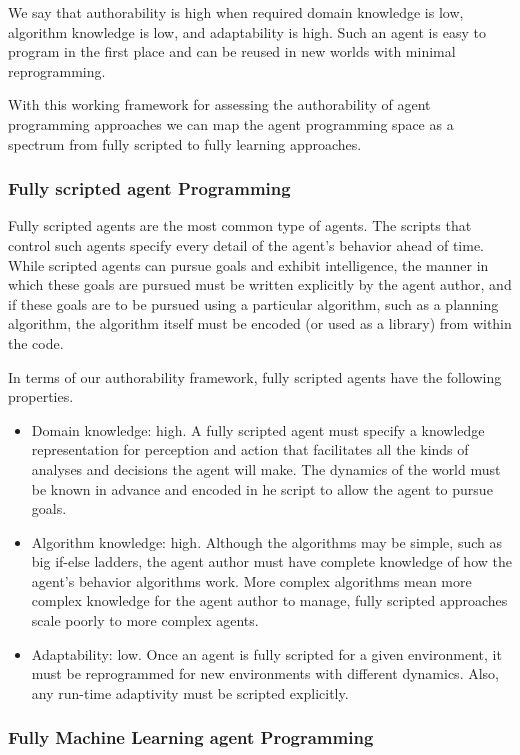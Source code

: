 We say that authorability is high when required domain knowledge is low, algorithm knowledge is low, and adaptability is high.  Such an agent is easy to program in the first place and can be reused in new worlds with minimal reprogramming.

With this working framework for assessing the authorability of agent programming approaches we can map the agent programming space as a spectrum from fully scripted to fully learning approaches.

\subsubsection{Fully scripted agent Programming}

Fully scripted agents are the most common type of agents.  The scripts that control such agents specify every detail of the agent's behavior ahead of time.  While scripted agents can pursue goals and exhibit intelligence, the manner in which these goals are pursued must be written explicitly by the agent author, and if these goals are to be pursued using a particular algorithm, such as a planning algorithm, the algorithm itself must be encoded (or used as a library) from within the code.

In terms of our authorability framework, fully scripted agents have the following properties.

\begin{itemize}
\item Domain knowledge: high. A fully scripted agent must specify a knowledge representation for perception and action that facilitates all the kinds of analyses and decisions the agent will make.  The dynamics of the world must be known in advance and encoded in he script to allow the agent to pursue goals.
\item Algorithm knowledge: high.  Although the algorithms may be simple, such as big if-else ladders, the agent author must have complete knowledge of how the agent's behavior algorithms work.  More complex algorithms mean more complex knowledge for the agent author to manage, fully scripted approaches scale poorly to more complex agents.
\item Adaptability: low.  Once an agent is fully scripted for a given environment, it must be reprogrammed for new environments with different dynamics.  Also, any run-time adaptivity must be scripted explicitly.
\end{itemize}

\subsubsection{Fully Machine Learning agent Programming}

